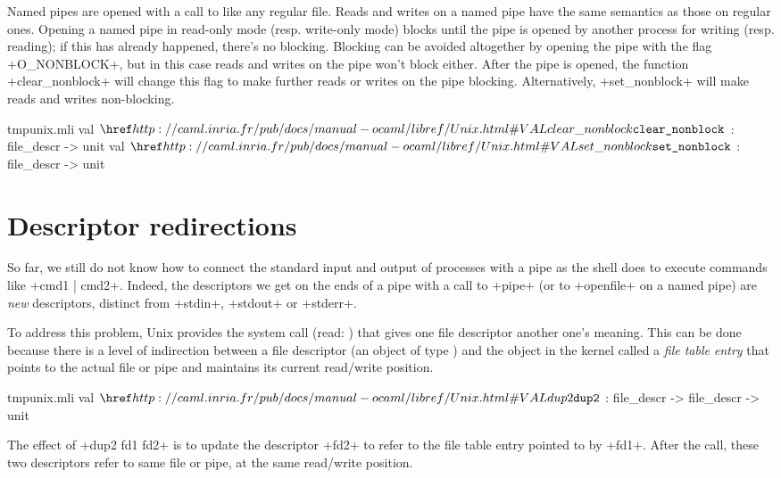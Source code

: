 Named pipes are opened with a call to  like any
regular file. Reads and writes on a named pipe have the same semantics
as those on regular ones. Opening a named pipe in read-only mode
(resp. write-only mode) blocks until the pipe is opened by another
process for writing (resp. reading); if this has already happened,
there's no blocking. Blocking can be avoided altogether by opening the
pipe with the flag \ml+O_NONBLOCK+, but in this case reads and writes
on the pipe won't block either. After the
pipe is opened, the function \ml+clear_nonblock+ will change this flag to make further
reads or writes on the pipe blocking. Alternatively,
\ml+set_nonblock+ will make reads and writes non-blocking.
%
\begin{listingcodefile}{tmpunix.mli}
val $\indexlibvalue{Unix}{clear\_nonblock}$ : file_descr -> unit
val $\indexlibvalue{Unix}{set\_nonblock}$ : file_descr -> unit
\end{listingcodefile}

\section{Descriptor redirections}

So far, we still do not know how to connect the standard input and
output of processes with a pipe as the shell does to execute
commands like \ml+cmd1 | cmd2+. Indeed, the descriptors we get on the
ends of a pipe with a call to \ml+pipe+ (or to \ml+openfile+ on a
named pipe) are \emph{new} descriptors, distinct from \ml+stdin+,
\ml+stdout+ or \ml+stderr+.

To address this problem, Unix provides the system call  
(read: ) that gives one file descriptor another one's meaning.
This
can be done because there is a level of indirection between a file
descriptor (an object of type ) and the object in the
kernel called a \emph{file table entry} that points to the actual
file or pipe and maintains its current read/write position.
%
\begin{listingcodefile}{tmpunix.mli}
val $\libvalue{Unix}{dup2}$ : file_descr -> file_descr -> unit
\end{listingcodefile}
%
The effect of \ml+dup2 fd1 fd2+ is to update the descriptor \ml+fd2+ to refer to
the file table entry pointed to by \ml+fd1+. After the call, these two
descriptors refer to same file or pipe, at the same read/write
position.

